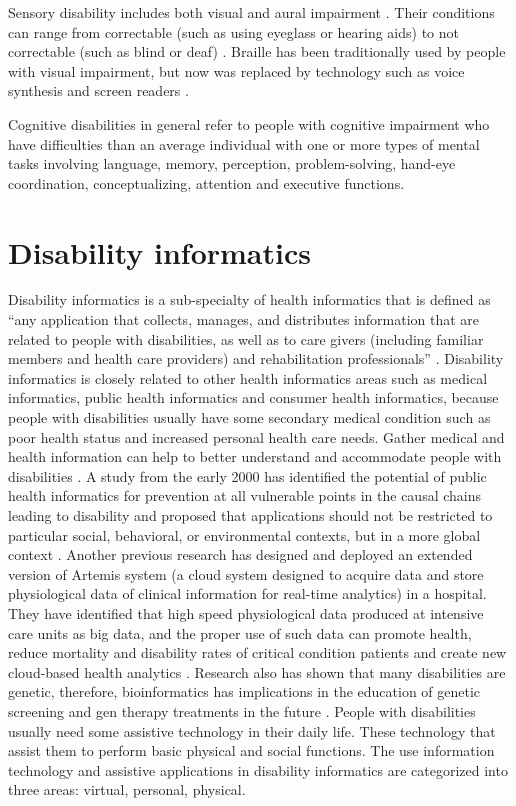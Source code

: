 \documentclass[sigconf]{acmart}
\begin{document}
Sensory disability includes both visual and aural impairment \cite{Appleyard2005}. Their conditions can range
from correctable (such as using eyeglass or hearing aids) to not correctable (such as blind or deaf) \cite{Riga13}. 
Braille has been traditionally used by people with visual impairment, but now was replaced by technology such as 
voice synthesis and screen readers \cite{Riga13}.

Cognitive disabilities in general refer to people with cognitive impairment who have difficulties than an average 
individual with one or more types of mental tasks involving language, memory, perception, problem-solving, 
hand-eye coordination, conceptualizing, attention and executive functions\cite{Appleyard2005}. 

\section{Disability informatics}
Disability informatics is a sub-specialty of health informatics that is defined as ``any application that
collects, manages, and distributes information that are related to people with disabilities, as well as to
care givers (including familiar members and health care providers) and rehabilitation professionals''
\cite{Appleyard2005}. Disability informatics is closely related to other health informatics areas such as
medical informatics, public health informatics and consumer health informatics, because people with
disabilities usually have some secondary medical condition such as poor health status and increased
personal health care needs. Gather medical and health information can help to better understand and
accommodate people with disabilities \cite{Riga13}. A study from the early 2000 has identified the
potential of public health informatics for prevention at all vulnerable points in the causal chains leading
to disability and proposed that  applications should not be restricted to particular social, behavioral,
or environmental contexts, but in a more global context \cite{Yasnoff}.  Another previous research has
designed and deployed an extended version of Artemis system (a cloud system designed to acquire data and
store physiological data of clinical information for real-time analytics) in a hospital. They have
identified that high speed physiological data produced at intensive care units as big data, and the proper
use of such data can promote health, reduce mortality and disability rates of critical condition patients
and create new cloud-based health analytics \cite{Khazaei14}. Research also has shown that many
disabilities are genetic, therefore, bioinformatics has implications in the education of genetic screening
and gen therapy treatments in the future \cite{Appleyard2005}. People with disabilities usually need some 
assistive technology in their daily life. These technology that assist them to perform basic physical and 
social functions. The use information technology and assistive applications in disability informatics are 
categorized into three areas: virtual, personal, physical.
 
\end{document}
